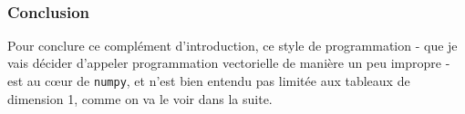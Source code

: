     \begin{center}
    \end{center}
    { \hspace*{\fill} \\}
    
    \hypertarget{conclusion}{%
\subsubsection{Conclusion}\label{conclusion}}

    Pour conclure ce complément d'introduction, ce style de programmation -
que je vais décider d'appeler programmation vectorielle de manière un
peu impropre - est au cœur de \texttt{numpy}, et n'est bien entendu pas
limitée aux tableaux de dimension 1, comme on va le voir dans la suite.


    
    
    
